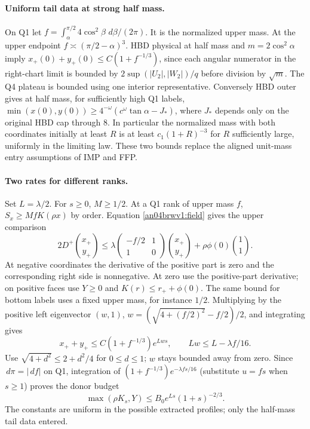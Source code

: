 \documentclass[11pt]{article}
\newcommand{\dd}{\,d}\newcommand{\E}{\mathbb E}
\begin{document}
\paragraph{Uniform tail data at strong half mass.}
On Q1 let $f=\int_\alpha^{\pi/2}4\cos^2\beta\,\dd\beta/(2\pi)$.
It is the normalized upper mass. At the upper endpoint
$f\asymp(\pi/2-\alpha)^3$. HBD physical at half mass and
$m=2\cos^2\alpha$ imply
$x_+(0)+y_+(0)\le C(1+f^{-1/3})$, since each angular numerator
in the right-chart limit is bounded by
$2\sup(|U_2|,|W_2|)/q$ before division by $\sqrt m$.
The Q4 plateau is bounded using one interior representative.
Conversely HBD outer gives at half mass, for sufficiently high
Q1 labels,
$\min(x(0),y(0))\ge 4^{-\omega}(c^\omega\tan\alpha-J_*)$,
where $J_*$ depends only on the original HBD cap through $8$.
In particular the normalized mass with both coordinates initially
at least $R$ is at least $c_1(1+R)^{-3}$ for $R$ sufficiently
large, uniformly in the limiting law. These two bounds replace
the aligned unit-mass entry assumptions of IMP and FFP.

\paragraph{Two rates for different ranks.}
Set $L=\lambda/2$. For $s\ge0$, $M\ge1/2$. At a Q1 rank of upper
mass $f$, $S_x\ge MfK(\rho x)$ by order. Equation
\eqref{an04brwv1:field} gives the upper comparison
\[
 2D^+\binom{x_+}{y_+}\le
 \lambda\begin{pmatrix}-f/2&1\\1&0\end{pmatrix}
 \binom{x_+}{y_+}+\rho\phi(0)\binom11 .
\]
At negative coordinates the derivative of the positive part is
zero and the corresponding right side is nonnegative. At zero use
the positive-part derivative; on positive faces use $Y\ge0$ and
$K(r)\le r_++\phi(0)$. The same bound for bottom labels uses a
fixed upper mass, for instance $1/2$. Multiplying by the positive
left eigenvector $(w,1)$,
$w=(\sqrt{4+(f/2)^2}-f/2)/2$, and integrating gives
\[
 x_++y_+\le C(1+f^{-1/3})e^{Lws},\qquad
 Lw\le L-\lambda f/16.
\]
Use $\sqrt{4+d^2}\le2+d^2/4$ for $0\le d\le1$; $w$ stays bounded
away from zero. Since $\dd\pi=|\dd f|$ on Q1, integration of
$(1+f^{-1/3})e^{-\lambda fs/16}$ (substitute $u=fs$ when
$s\ge1$) proves the donor budget
\begin{equation}\label{an04brwv1:budget}
 \max(\rho K_s,Y)\le B_0 e^{Ls}(1+s)^{-2/3}.
\end{equation}
The constants are uniform in the possible extracted profiles;
only the half-mass tail data entered.
\end{document}
